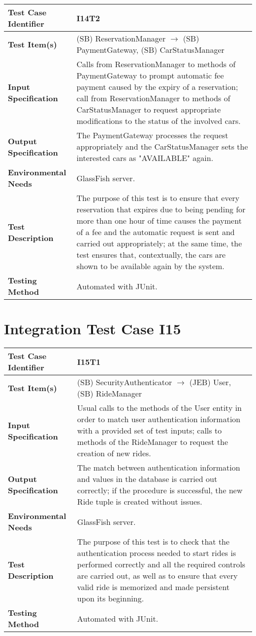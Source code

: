 \begin{longtable}{p{} | p{}}
\hline
\textbf{Test Case Identifier} & I14T2\\
\hline
\textbf{Test Item(s)} & (SB) ReservationManager $\rightarrow$ (SB) PaymentGateway, (SB) CarStatusManager \\
\hline
\textbf{Input Specification} & Calls from ReservationManager to methods of PaymentGateway to prompt automatic fee payment caused by the expiry of a reservation; call from ReservationManager to methods of CarStatusManager to request appropriate modifications to the status of the involved cars. \\
\hline
\textbf{Output Specification} & The PaymentGateway processes the request appropriately and the CarStatusManager sets the interested cars as "AVAILABLE" again. \\
\hline
\textbf{Environmental Needs} & GlassFish server. \\
\hline
\textbf{Test Description} & The purpose of this test is to ensure that every reservation that expires due to being pending for more than one hour of time causes the payment of a fee and the automatic request is sent and carried out appropriately; at the same time, the test ensures that, contextually, the cars are shown to be available again by the system. \\
\hline
\textbf{Testing Method} & Automated with JUnit. \\
\hline
\end{longtable}

\section{Integration Test Case I15}

\begin{longtable}{p{} | p{}}
\hline
\textbf{Test Case Identifier} & I15T1\\
\hline
\textbf{Test Item(s)} & (SB) SecurityAuthenticator $\rightarrow$ (JEB) User, (SB) RideManager \\
\hline
\textbf{Input Specification} & Usual calls to the methods of the User entity in order to match user authentication information with a provided set of test inputs; calls to methods of the RideManager to request the creation of new rides. \\
\hline
\textbf{Output Specification} & The match between authentication information and values in the database is carried out correctly; if the procedure is successful, the new Ride tuple is created without issues. \\
\hline
\textbf{Environmental Needs} & GlassFish server. \\
\hline
\textbf{Test Description} & The purpose of this test is to check that the authentication process needed to start rides is performed correctly and all the required controls are carried out, as well as to ensure that every valid ride is memorized and made persistent upon its beginning. \\
\hline
\textbf{Testing Method} & Automated with JUnit. \\
\hline
\end{longtable}

